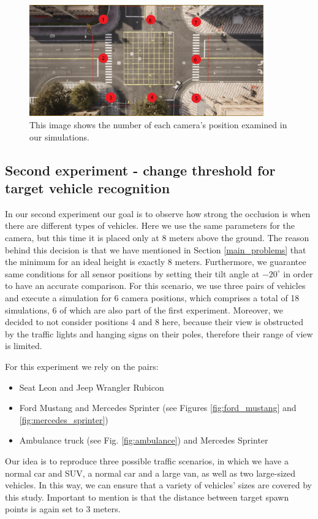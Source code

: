 \begin{figure} [h!]
    \centering
    \includegraphics[width=0.90\textwidth]{images/positions_numerated.png}
    \caption[Enumerated camera positions]{This image shows the number of each camera's position examined in our simulations.}
    \label{fig:positions_enumerated}
\end{figure}

\newpage
\subsection{Second experiment - change threshold for target vehicle recognition}
In our second experiment our goal is to observe how strong the occlusion is when there are different types of vehicles. Here we use the same parameters for the camera, but this time it is placed only at 8 meters above the ground. The reason behind this decision is that we have mentioned in Section \ref{main_problems} that the minimum for an ideal height is exactly 8 meters. Furthermore, we guarantee same conditions for all sensor positions by setting their tilt angle at $-20^{\circ}$ in order to have an accurate comparison. For this scenario, we use three pairs of vehicles and execute a simulation for 6 camera positions, which comprises a total of 18 simulations, 6 of which are also part of the first experiment. Moreover, we decided to not consider positions 4 and 8 here, because their view is obstructed by the traffic lights and hanging signs on their poles, therefore their range of view is limited.

For this experiment we rely on the pairs:
\begin{itemize}
    \item Seat Leon and Jeep Wrangler Rubicon
    \item Ford Mustang and Mercedes Sprinter (see Figures \ref{fig:ford_mustang} and \ref{fig:mercedes_sprinter})
    \item Ambulance truck (see Fig. \ref{fig:ambulance}) and Mercedes Sprinter
\end{itemize}
Our idea is to reproduce three possible traffic scenarios, in which we have a normal car and SUV, a normal car and a large van, as well as two large-sized vehicles. In this way, we can ensure that a variety of vehicles' sizes are covered by this study. Important to mention is that the distance between target spawn points is again set to 3 meters. 

